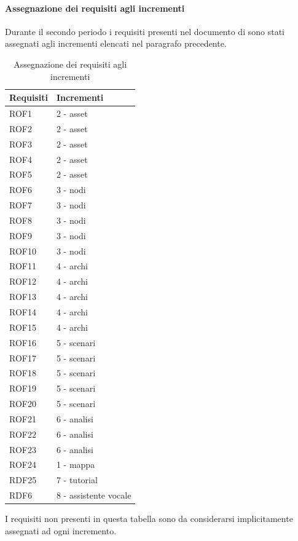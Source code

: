 		\paragraph{Assegnazione dei requisiti agli incrementi}
		Durante il secondo periodo i requisiti presenti nel documento di \adr sono stati assegnati agli incrementi elencati nel paragrafo precedente.
			\begin{table}[H]
				\centering
				\begin{tabular}{ll}
					\toprule
					\textbf{Requisiti}                           & \textbf{Incrementi}              \\
					\midrule
					ROF1 & 2 - asset \\
					ROF2 & 2 - asset \\
					ROF3 & 2 - asset \\
					ROF4 & 2 - asset \\
					ROF5 & 2 - asset \\
					\midrule
					ROF6 & 3 - nodi \\
					ROF7 & 3 - nodi \\
					ROF8 & 3 - nodi \\
					ROF9 & 3 - nodi \\
					ROF10 & 3 - nodi \\
					\midrule
					ROF11 & 4 - archi \\
					ROF12 & 4 - archi \\
					ROF13 & 4 - archi \\
					ROF14 & 4 - archi \\
					ROF15 & 4 - archi \\
					\midrule
					ROF16 & 5 - scenari \\
					ROF17 & 5 - scenari \\
					ROF18 & 5 - scenari \\
					ROF19 & 5 - scenari \\
					ROF20 & 5 - scenari \\
					\midrule
					ROF21 & 6 - analisi \\
					ROF22 & 6 - analisi \\
					ROF23 & 6 - analisi \\
					\midrule
					ROF24 & 1 - mappa \\
					\midrule
					RDF25 & 7 - tutorial \\
					\midrule
					RDF6  & 8 - assistente vocale \\
					\bottomrule
				\end{tabular}
				\caption{Assegnazione dei requisiti agli incrementi}
			\end{table}
		I requisiti non presenti in questa tabella sono da considerarsi implicitamente assegnati ad ogni incremento.
